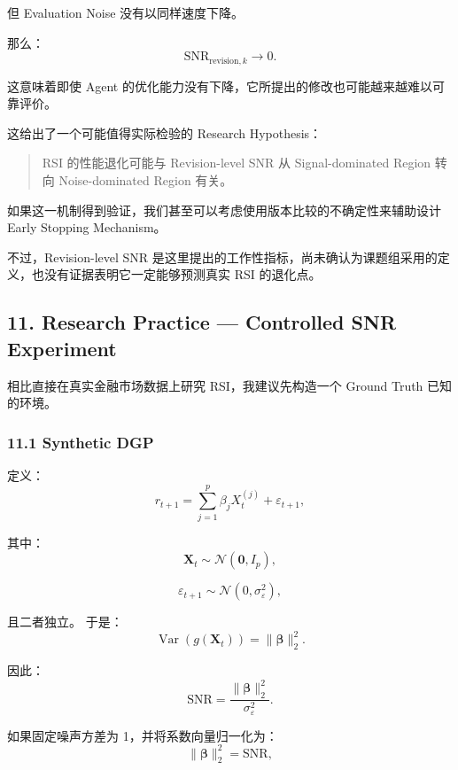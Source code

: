 但 Evaluation Noise 没有以同样速度下降。

那么：
\[\mathrm{SNR}_{\mathrm{revision},k}
\longrightarrow0.\]

这意味着即使 Agent 的优化能力没有下降，它所提出的修改也可能越来越难以可靠评价。


这给出了一个可能值得实际检验的 Research Hypothesis：

\begin{quote}
RSI 的性能退化可能与 Revision-level SNR 从 Signal-dominated Region 转向 Noise-dominated Region 有关。
\end{quote}

如果这一机制得到验证，我们甚至可以考虑使用版本比较的不确定性来辅助设计 Early Stopping Mechanism。

不过，Revision-level SNR 是这里提出的工作性指标，尚未确认为课题组采用的定义，也没有证据表明它一定能够预测真实 RSI 的退化点。

\hypertarget{part-4-60-0001-research-practice-controlled-snr-experiment}{%
\subsection{11. Research Practice --- Controlled SNR Experiment}\label{part-4-60-0001-research-practice-controlled-snr-experiment}}

相比直接在真实金融市场数据上研究 RSI，我建议先构造一个 Ground Truth 已知的环境。

\hypertarget{part-4-60-0001-synthetic-dgp}{%
\subsubsection{11.1 Synthetic DGP}\label{part-4-60-0001-synthetic-dgp}}

定义：
\[r_{t+1}
=
\sum_{j=1}^{p}\beta_jX_t^{(j)}
+\varepsilon_{t+1},\]

其中：
\[\boldsymbol X_t\sim\mathcal N(\boldsymbol 0,I_p),\]

\[\varepsilon_{t+1}\sim
\mathcal N(0,\sigma_\varepsilon^2),\]

且二者独立。 于是：
\[\operatorname{Var}(g(\boldsymbol X_t))
=
\|\boldsymbol\beta\|_2^2.\]

因此：
\[\boxed{
\mathrm{SNR}
=
\frac{\|\boldsymbol\beta\|_2^2}
{\sigma_\varepsilon^2}.
}\]

如果固定噪声方差为 1，并将系数向量归一化为：
\[\|\boldsymbol\beta\|_2^2=\mathrm{SNR},\]

